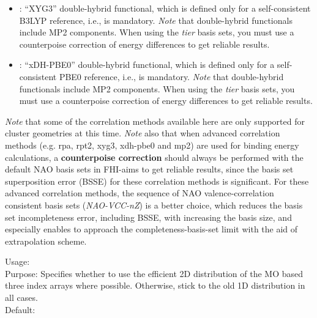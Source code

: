 \begin{itemize}
    Phys. Rev. B. 86, 035130 (2012).
  \item {} : ``XYG3'' double-hybrid functional\cite{Zhang2009}, which is
    defined only for a self-consistent B3LYP reference, i.e.,
      is mandatory. \emph{Note} that double-hybrid
    functionals include MP2 components. When using the \emph{tier} basis sets,
    you must use a counterpoise correction of energy differences to get 
    reliable results.
  \item {} : ``xDH-PBE0'' double-hybrid functional\cite{Zhang2012}, which is
    defined only for a self-consistent PBE0 reference, i.e.,
      is mandatory. \emph{Note} that double-hybrid
    functionals include MP2 components. When using the \emph{tier} basis sets,
    you must use a counterpoise correction of energy differences to get 
    reliable results.
\end{itemize}
\emph{Note} that some of the correlation methods available here are only
supported for cluster geometries at this time. 
\emph{Note} also that when advanced correlation methods (e.g. rpa, rpt2, xyg3, xdh-pbe0 and mp2) are 
used for binding energy calculations, a \textbf{counterpoise correction} should always be
performed with the default NAO basis sets in FHI-aims to get reliable results, 
since the basis set superposition error (BSSE) for these correlation methods is significant.
For these advanced correlation methods, the sequence of NAO valence-correlation consistent 
basis sets (\emph{NAO-VCC-nZ}\cite{Zhang2013}) is a better choice, which reduces the basis set incompleteness error,
including BSSE, with increasing the basis size, and especially enables to approach the completeness-basis-set
limit with the aid of extrapolation scheme.

{
 \noindent
 Usage:   \\[1.0ex]
 Purpose: Specifies whether to use the efficient 2D distribution of the MO
 based three index arrays where possible.  Otherwise, stick to the old 1D
 distribution in all cases.
 \\[1.0ex]
 Default:  \\[1.0ex]
}

